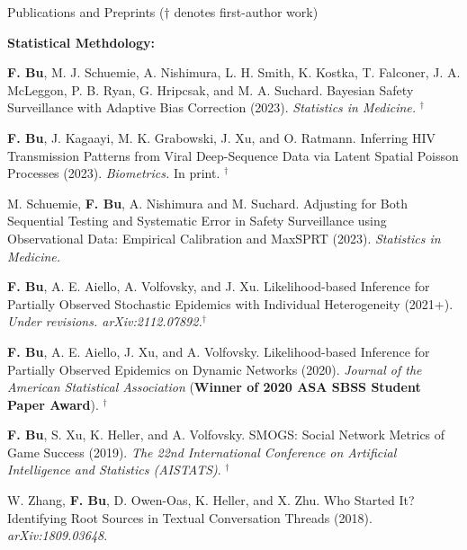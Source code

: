 \documentclass{resume} %
\begin{document}


\begin{rSection}{Publications and Preprints}
{\footnotesize{($\dagger$ denotes first-author work)}}

\hspace{-.2in} \textbf{Statistical Methdology:}

\textbf{F. Bu}, M. J. Schuemie,  A. Nishimura, L. H. Smith, K. Kostka, T. Falconer, J. A. McLeggon, P. B. Ryan, G. Hripcsak, and M. A. Suchard.
Bayesian Safety Surveillance with Adaptive Bias Correction (2023). \emph{Statistics in Medicine.} $^\dagger$

\smallskip

\textbf{F. Bu}, J. Kagaayi, M. K. Grabowski, J. Xu, and O. Ratmann.
Inferring HIV Transmission Patterns from Viral Deep-Sequence Data via Latent Spatial Poisson Processes (2023). \emph{Biometrics.} In print. $^\dagger$

\smallskip

M. Schuemie, \textbf{F. Bu}, A. Nishimura and M. Suchard.
Adjusting for Both Sequential Testing and Systematic Error in Safety Surveillance using Observational Data: Empirical Calibration and MaxSPRT (2023). \emph{Statistics in Medicine.}

\smallskip


\textbf{F. Bu}, A. E. Aiello, A. Volfovsky, and J. Xu.  
Likelihood-based Inference for Partially Observed Stochastic Epidemics with Individual Heterogeneity (2021+). \emph{Under revisions.  arXiv:2112.07892.}$^\dagger$

\smallskip


\textbf{F. Bu}, A. E. Aiello, J. Xu, and A. Volfovsky. 
Likelihood-based Inference for Partially Observed Epidemics on Dynamic Networks (2020). \emph{Journal of the American Statistical Association} (\textbf{Winner of 2020 ASA SBSS Student Paper Award}). $^\dagger$

\smallskip

\textbf{F. Bu}, S. Xu, K. Heller, and A. Volfovsky. 
SMOGS: Social Network Metrics of Game Success (2019). \emph{The 22nd International Conference on Artificial Intelligence and Statistics (AISTATS)}. $^\dagger$

\smallskip

W. Zhang, \textbf{F. Bu}, D. Owen-Oas, K. Heller, and X. Zhu. 
Who Started It? Identifying Root Sources in Textual Conversation Threads (2018). \emph{arXiv:1809.03648}.


\end{rSection}
\end{document}
